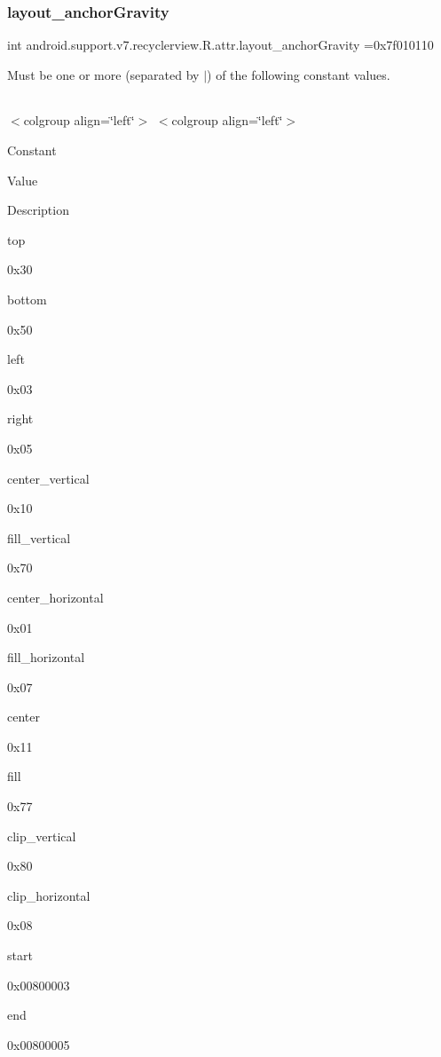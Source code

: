 \subsubsection{\texorpdfstring{layout\+\_\+anchor\+Gravity}{layout\_anchorGravity}}
{\footnotesize\ttfamily int android.\+support.\+v7.\+recyclerview.\+R.\+attr.\+layout\+\_\+anchor\+Gravity =0x7f010110\hspace{0.3cm}{\ttfamily [static]}}

Must be one or more (separated by \textquotesingle{}$\vert$\textquotesingle{}) of the following constant values.

\tabulinesep=1mm
\begin{longtabu} spread 0pt [c]{*{0}{|X[-1]}|}
\hline
\end{longtabu}
$<$colgroup align=\char`\"{}left\char`\"{}$>$ $<$colgroup align=\char`\"{}left\char`\"{}$>$ 

Constant

Value

Description 

{\ttfamily top}

0x30

{\ttfamily bottom}

0x50

{\ttfamily left}

0x03

{\ttfamily right}

0x05

{\ttfamily center\+\_\+vertical}

0x10

{\ttfamily fill\+\_\+vertical}

0x70

{\ttfamily center\+\_\+horizontal}

0x01

{\ttfamily fill\+\_\+horizontal}

0x07

{\ttfamily center}

0x11

{\ttfamily fill}

0x77

{\ttfamily clip\+\_\+vertical}

0x80

{\ttfamily clip\+\_\+horizontal}

0x08

{\ttfamily start}

0x00800003

{\ttfamily end}

0x00800005\mbox{\label{classandroid_1_1support_1_1v7_1_1recyclerview_1_1R_1_1attr_af56be46f3648b3d53cd7f53d6223f955}} 
